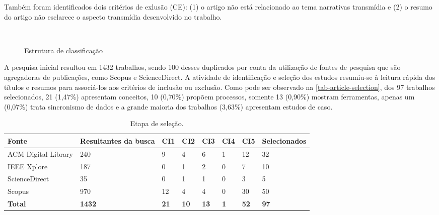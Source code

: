 \documentclass[
article,			%
11pt,				%
oneside,			%
a4paper,			%
english,			%
brazil,				%
sumario=tradicional
]{abntex2}
\begin{document}
  Também foram identificados dois critérios de exlusão (CE): (1) o artigo não está relacionado ao tema narrativas transmídia e (2) o resumo do artigo não esclarece o aspecto transmídia desenvolvido no trabalho.

  \begin{figure}[htb]
    \caption{\label{diag-trata-de-para}Estrutura de classificação}
    \begin{center}
       \\
    \end{center}
  \end{figure}

  A pesquisa inicial resultou em 1432 trabalhos, sendo 100 desses duplicados por conta da utilização de fontes de pesquisa que são agregadoras de publicações, como Scopus e ScienceDirect. A atividade de identificação e seleção dos estudos resumiu-se à leitura rápida dos títulos e resumos para associá-los aos critérios de inclusão ou exclusão. Como pode ser observado na \autoref{tab-article-selection}, dos 97 trabalhos selecionados, 21 (1,47\%) apresentam conceitos, 10 (0,70\%) propõem processos, somente 13 (0,90\%) mostram ferramentas, apenas um (0,07\%) trata sincronismo de dados e a grande maioria dos trabalhos (3,63\%) apresentam estudos de caso.

  \begin{table}[htb]
    \ABNTEXfontereduzida
    \caption[Etapa de seleção]{Etapa de seleção.}
    \label{tab-article-selection}
    \begin{tabular}{p{3.0cm}|p{2.0cm}|p{1.0cm}|p{1.0cm}|p{1.0cm}|p{1.0cm}|p{1.0cm}|p{2.0cm}}
      \textbf{Fonte} & \textbf{Resultantes da busca} & \textbf{CI1} & \textbf{CI2} & \textbf{CI3} & \textbf{CI4} & \textbf{CI5} & \textbf{Selecionados}  \\
      \hline
      ACM Digital Library & 240 & 9 & 4 & 6 & 1 & 12 & 32 \\
      \hline
      IEEE Xplore & 187 & 0 & 1 & 2 & 0 & 7 & 10 \\
      \hline
      ScienceDirect & 35 & 0 & 1 & 1 & 0 & 3 & 5 \\
      \hline
      Scopus & 970 & 12 & 4 & 4 & 0 & 30 & 50 \\
      \hline
      \textbf{Total} & \textbf{1432} & \textbf{21} & \textbf{10} & \textbf{13} & \textbf{1} & \textbf{52} & \textbf{97} \\
    \end{tabular}
  \end{table}
\end{document}
